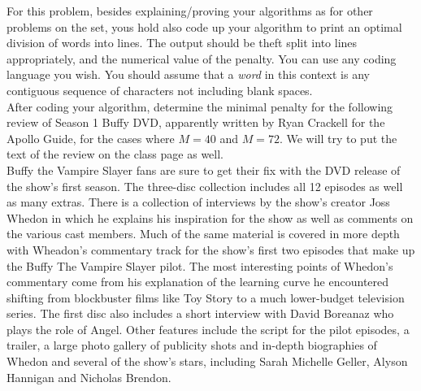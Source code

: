 \documentclass[tikz, 12pt]{scrartcl}
\begin{document}
\begin{enumerate}
	For this problem, besides explaining/proving your algorithms as for other problems on the set, yous hold also code up your algorithm to print an optimal division of words into lines. The output should be theft split into lines appropriately, and the numerical value of the penalty. You can use any coding language you wish. You should assume that a \textit{word} in this context is any contiguous sequence of characters not including blank spaces.\\
	After coding your algorithm, determine the minimal penalty for the following review of Season 1 Buffy DVD, apparently written by Ryan Crackell for the Apollo Guide, for the cases where $M = 40$ and $M = 72$. We will try to put the text of the review on the class page as well.\\
	Buffy the Vampire Slayer fans are sure to get their fix with the DVD release of the show's first season. The three-disc collection includes all 12 episodes as well as many extras. There is a collection of interviews by the show's creator Joss Whedon in which he explains his inspiration for the show as well as comments on the various cast members. Much of the same material is covered in more depth with Wheadon's commentary track for the show's first two episodes that make up the Buffy The Vampire Slayer pilot. The most interesting points of Whedon's commentary come from his explanation of the learning curve he encountered shifting from blockbuster films like Toy Story to a much lower-budget television series. The first disc also includes a short interview with David Boreanaz who plays the role of Angel. Other features include the script for the pilot episodes, a trailer, a large photo gallery of publicity shots and in-depth biographies of Whedon and several of the show's stars, including Sarah Michelle Geller, Alyson Hannigan and Nicholas Brendon.
\end{enumerate}
\end{document}
